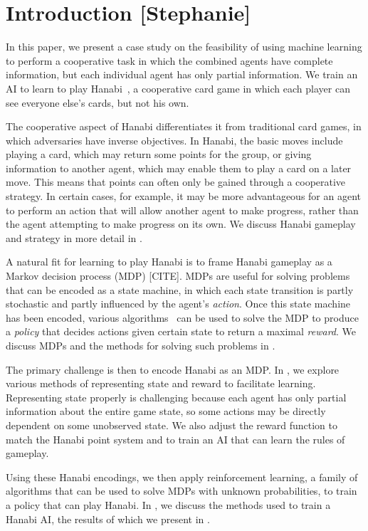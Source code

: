 \section{Introduction [Stephanie]}
\label{sec:intro}

In this paper, we present a case study on the feasibility of using machine
learning to perform a cooperative task in which the combined agents have
complete information, but each individual agent has only partial information.
We train an AI to learn to play Hanabi~\cite{hanabiboardgame}, a cooperative
card game in which each player can see everyone else's cards, but not his own.

The cooperative aspect of Hanabi differentiates it from traditional card games,
in which adversaries have inverse objectives. In Hanabi, the basic moves
include playing a card, which may return some points for the group, or giving
information to another agent, which may enable them to play a card on a later
move. This means that points can often only be gained through a cooperative
strategy. In certain cases, for example, it may be more advantageous for an
agent to perform an action that will allow another agent to make progress,
rather than the agent attempting to make progress on its own. We discuss Hanabi
gameplay and strategy in more detail in .

A natural fit for learning to play Hanabi is to frame Hanabi gameplay as a
Markov decision process (MDP) [CITE]. MDPs are useful for solving problems that
can be encoded as a state machine, in which each state transition is partly
stochastic and partly influenced by the agent's \emph{action}. Once this state
machine has been encoded, various algorithms~\cite{TRPO} can be used to solve
the MDP to produce a \emph{policy} that decides actions given certain state to
return a maximal \emph{reward}. We discuss MDPs and the methods for solving
such problems in .

The primary challenge is then to encode Hanabi as an MDP. In
, we explore various methods of representing state and reward
to facilitate learning. Representing state properly is challenging because each
agent has only partial information about the entire game state, so some actions
may be directly dependent on some unobserved state. We also adjust the reward
function to match the Hanabi point system and to train an AI that can learn the
rules of gameplay.

Using these Hanabi encodings, we then apply reinforcement learning, a family of
algorithms that can be used to solve MDPs with unknown probabilities, to train
a policy that can play Hanabi. In , we discuss the
methods used to train a Hanabi AI, the results of which we present in
.

